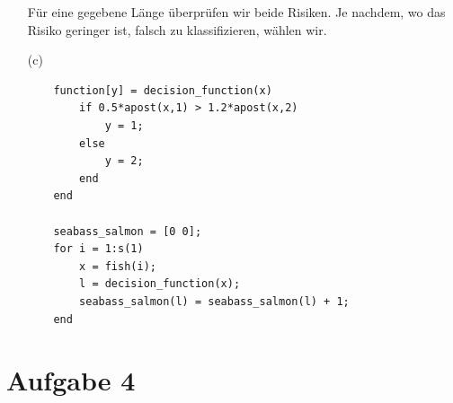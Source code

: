 \documentclass[a4paper]{scrartcl}
\begin{document}
\begin{itemize}
	Für eine gegebene Länge überprüfen wir beide Risiken. Je nachdem, wo das Risiko geringer ist, falsch zu klassifizieren, wählen wir.
	
	
	
	
		\item[(c)] 
	
	\begin{lstlisting}
	function[y] = decision_function(x)
		if 0.5*apost(x,1) > 1.2*apost(x,2)
			y = 1;
		else
			y = 2;
		end
	end
	
	seabass_salmon = [0 0];
	for i = 1:s(1)
		x = fish(i);
		l = decision_function(x);
		seabass_salmon(l) = seabass_salmon(l) + 1;
	end
	\end{lstlisting}
\end{itemize}

\section*{Aufgabe 4}
\end{document}

